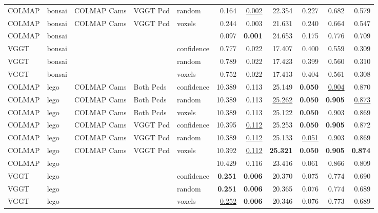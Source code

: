 \begin{table}[H]
\begin{tabular}{lllllrrrrrr}
COLMAP & bonsai & COLMAP Cams & VGGT Pcd & random & 0.164 & \underline{0.002} & 22.354 & 0.227 & 0.682 & 0.579 \\
COLMAP & bonsai & COLMAP Cams & VGGT Pcd & voxels & 0.244 & 0.003 & 21.631 & 0.240 & 0.664 & 0.547 \\
COLMAP & bonsai &  &  &  & 0.097 & \textbf{0.001} & 24.653 & 0.175 & 0.776 & 0.709 \\
VGGT & bonsai &  &  & confidence & 0.777 & 0.022 & 17.407 & 0.400 & 0.559 & 0.309 \\
VGGT & bonsai &  &  & random & 0.789 & 0.022 & 17.423 & 0.399 & 0.560 & 0.310 \\
VGGT & bonsai &  &  & voxels & 0.752 & 0.022 & 17.413 & 0.404 & 0.561 & 0.308 \\
\midrule
COLMAP & lego & COLMAP Cams & Both Pcds & confidence & 10.389 & 0.113 & 25.149 & \textbf{0.050} & \underline{0.904} & 0.870 \\
COLMAP & lego & COLMAP Cams & Both Pcds & random & 10.389 & 0.113 & \underline{25.262} & \textbf{0.050} & \textbf{0.905} & \underline{0.873} \\
COLMAP & lego & COLMAP Cams & Both Pcds & voxels & 10.389 & 0.113 & 25.122 & \textbf{0.050} & 0.903 & 0.869 \\
COLMAP & lego & COLMAP Cams & VGGT Pcd & confidence & 10.395 & \underline{0.112} & 25.253 & \textbf{0.050} & \textbf{0.905} & 0.872 \\
COLMAP & lego & COLMAP Cams & VGGT Pcd & random & 10.389 & \underline{0.112} & 25.133 & \underline{0.051} & 0.903 & 0.869 \\
COLMAP & lego & COLMAP Cams & VGGT Pcd & voxels & 10.392 & \underline{0.112} & \textbf{25.321} & \textbf{0.050} & \textbf{0.905} & \textbf{0.874} \\
COLMAP & lego &  &  &  & 10.429 & 0.116 & 23.416 & 0.061 & 0.866 & 0.809 \\
VGGT & lego &  &  & confidence & \textbf{0.251} & \textbf{0.006} & 20.370 & 0.075 & 0.774 & 0.690 \\
VGGT & lego &  &  & random & \textbf{0.251} & \textbf{0.006} & 20.365 & 0.076 & 0.774 & 0.689 \\
VGGT & lego &  &  & voxels & \underline{0.252} & \textbf{0.006} & 20.346 & 0.076 & 0.773 & 0.689 \\
\bottomrule
\end{tabular}
\end{table}